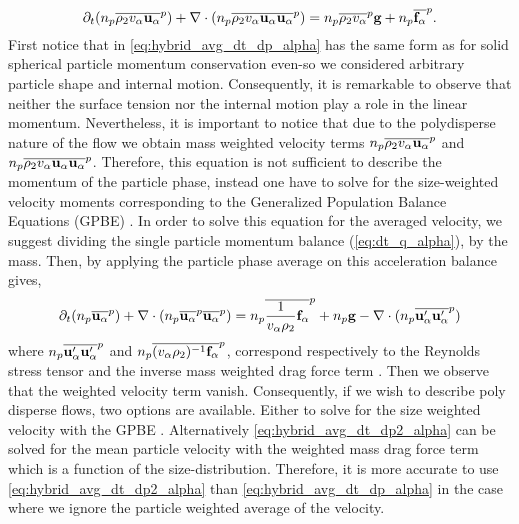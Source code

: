 \begin{equation}
    \partial_t (n_p\overline{\rho_2 v_\alpha\textbf{u}_\alpha}^{p})
    + \mathbf{\nabla} \cdot(n_p\overline{\rho_2 v_\alpha \textbf{u}_\alpha \textbf{u}_\alpha }^{p})
    = n_p\overline{\rho_2 v_\alpha}^{p}\textbf{g}
    + n_p\overline{\textbf{f}_\alpha}^{p}.
    \label{eq:hybrid_avg_dt_dp_alpha}\\
\end{equation}
First notice that in \ref{eq:hybrid_avg_dt_dp_alpha} has the same form as for solid spherical particle momentum conservation \citep{jackson1997locally} even-so we considered arbitrary particle shape and internal motion. 
Consequently, it is remarkable to observe that neither the surface tension nor the internal motion play a role in the linear momentum. 
Nevertheless, it is important to notice that due to the polydisperse nature of the flow we obtain mass weighted velocity terms $n_p\overline{\rho_2 v_\alpha\textbf{u}_\alpha}^{p}$ and $n_p\overline{\rho_2 v_\alpha\textbf{u}_\alpha\textbf{u}_\alpha}^{p}$. 
Therefore, this equation is not sufficient to describe the momentum of the particle phase, instead one have to solve for the size-weighted velocity moments corresponding to the Generalized Population Balance Equations (GPBE)  \citep{fox2023generalized}. 
In order to solve this equation for the averaged velocity, we suggest dividing the single particle momentum balance (\ref{eq:dt_q_alpha}), by the mass. 
Then, by applying the particle phase average on this acceleration balance gives, 
\begin{equation}
    \partial_t (n_p\overline{\textbf{u}_\alpha}^{p})
    + \mathbf{\nabla} \cdot(n_p\overline{\textbf{u}_\alpha}^{p}\overline{ \textbf{u}_\alpha }^{p})
    = 
    n_p\overline{\frac{1}{v_\alpha\rho_2}\textbf{f}_\alpha}^{p}
    + n_p \textbf{g}
    - \mathbf{\nabla} \cdot(n_p\overline{\textbf{u}'_\alpha \textbf{u}'_\alpha }^{p})
    \label{eq:hybrid_avg_dt_dp2_alpha}
\end{equation}
where $n_p\overline{\textbf{u}'_\alpha \textbf{u}'_\alpha }^{p}$ and $n_p\overline{(v_\alpha\rho_2)^{-1} \textbf{f}_\alpha }^{p}$, correspond respectively to the Reynolds stress tensor and the inverse mass weighted drag force term \citep{jackson1997locally}. 
Then we observe that the weighted velocity term vanish. 
Consequently, if we wish to describe poly disperse flows, two options are available. 
Either to solve for the size weighted velocity with the GPBE \citet{fox2023generalized,marchisio2013computational}.
Alternatively \ref{eq:hybrid_avg_dt_dp2_alpha} can be solved for the mean particle velocity with the weighted mass drag force term which is a function of the size-distribution.  
Therefore, it is more accurate to use \ref{eq:hybrid_avg_dt_dp2_alpha} than \ref{eq:hybrid_avg_dt_dp_alpha} in the case where we ignore the particle weighted average of the velocity. 
 



